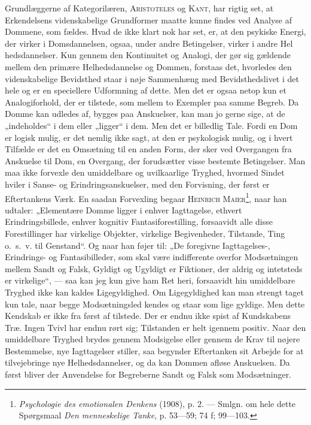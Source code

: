 \documentclass[12pt]{article}
\newcommand{\opage}[1]{\marginnote{\footnotesize\textit{[#1]}}}
\begin{document}
Grundlæggerne af Kategorilæren, \textsc{Aristoteles} og \textsc{Kant}, har
rigtig set, at Erkendelsens videnskabelige Grundformer maatte kunne findes ved
Analyse af Dommene, som fældes. Hvad de ikke klart nok har set, er, at den
psykiske Energi, der virker i Domsdannelsen, ogsaa, under andre Betingelser,
virker i andre Hel%
\setcounter{footnote}{0}%
\opage{8}hedsdannelser. Kun gennem den Kontinuitet og Analogi, der gør sig
gældende mellem den primære Helhedsdannelse og Dommen, forstaas det, hvorledes
den videnskabelige Bevidsthed staar i nøje Sammenhæng med Bevidsthedslivet i
det hele og er en speciellere Udformning af dette. Men det er ogsaa netop kun
et Analogiforhold, der er tilstede, som mellem to Exempler paa samme Begreb. Da
Domme kan udledes af, bygges paa Anskuelser, kan man jo gerne sige, at de
„indeholdes“ i dem eller „ligger“ i dem. Men det er billedlig Tale. Fordi en
Dom er logisk mulig, er det nemlig ikke sagt, at den er psykologisk mulig, og i
hvert Tilfælde er det en Omsætning til en anden Form, der sker ved Overgangen
fra Anskuelse til Dom, en Overgang, der forudsætter visse bestemte Betingelser.
Man maa ikke forvexle den umiddelbare og uvilkaarlige Tryghed, hvormed Sindet
hviler i Sanse- og Erindringsanskuelser, med den Forvisning, der først er
Eftertankens Værk. En saadan Forvexling begaar \textsc{Heinrich
Maier}\footnote{\textit{Psychologie des emotionalen Denkens} (1908), p. 2. ---
Smlgn. om hele dette Spørgsmaal \textit{Den menneskelige Tanke}, p. 53---59; 74
f; 99---103.}, naar han udtaler: „Elementære Domme ligger i enhver Iagttagelse,
ethvert Erindringsbillede, enhver kognitiv Fantasiforestilling, forsaavidt alle
disse Forestillinger har virkelige Objekter, virkelige Begivenheder, Tilstande,
Ting o.~s.~v. til Genstand“. Og naar han føjer til: „De foregivne
Iagttagelses-, Erindrings- og Fantasibilleder, som skal være indifferente
overfor Modsætningen mellem Sandt og Falsk, Gyldigt og Ugyldigt er Fiktioner,
der aldrig og intetsteds er virkelige“, --- saa kan jeg kun give ham Ret heri,
forsaavidt hin umiddelbare Tryghed ikke kan kaldes Ligegyldighed. Om
Ligegyldighed kan man strengt taget kun tale, naar begge Modsætningsled kendes
og staar som lige gyldige. Men dette Kendskab er ikke fra først af tilstede.
Der er endnu ikke spist af Kundskabens Træ. Ingen Tvivl har endnu rørt sig;
Tilstanden er helt igennem positiv. Naar den umiddelbare Tryghed brydes gennem
Modsigelse eller gennem de Krav til nøjere Bestemmelse, nye Iagttagelser
stiller, saa begynder Eftertanken sit Arbejde for at tilvejebringe nye
Helhedsdannelser, og da kan Dommen afløse Anskuelsen. Da først bliver der
Anvendelse for Begreberne Sandt og Falsk som Modsætninger.
\end{document}
